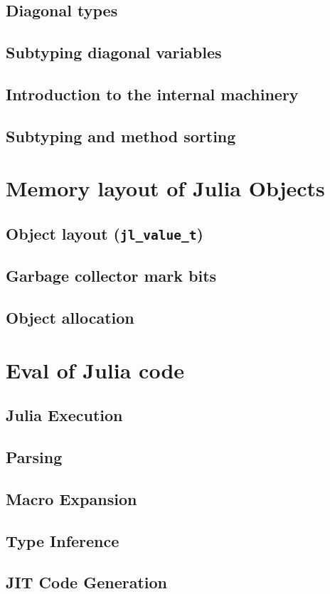     \subsection{Diagonal types}
    \subsection{Subtyping diagonal variables}
    \subsection{Introduction to the internal machinery}
    \subsection{Subtyping and method sorting}
    \section{Memory layout of Julia Objects}
    \subsection{Object layout (\texttt{jl\_value\_t})}
    \subsection{Garbage collector mark bits}
    \subsection{Object allocation}
    \section{Eval of Julia code}
    \subsection{Julia Execution}
    \subsection{Parsing}
    \subsection{Macro Expansion}
    \subsection{Type Inference}
    \subsection{JIT Code Generation}
